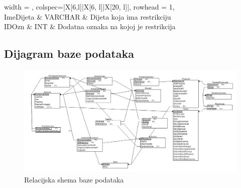 \begin{longtblr}[
					label=none,
					entry=none
					]{
						width = \textwidth,
						colspec={|X[6,l]|X[6, l]|X[20, l]|}, 
						rowhead = 1,
					}
					\hline {} \\ \hline[3pt]
					ImeDijeta & VARCHAR & Dijeta koja ima restrikciju \\ \hline
					IDOzn & INT & Dodatna oznaka na kojoj je restrikcija \\ \hline
				\end{longtblr}







\subsection{Dijagram baze podataka}
			\begin{figure}[H]
					\centering
					\includegraphics[scale=0.4]{slike/REL-model-baze.png}
					\caption{Relacijska shema baze podataka}
					\label{fig:REL-model-baze}
				\end{figure} 
			\eject
			
			
